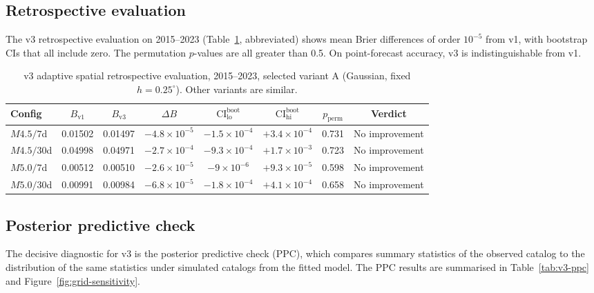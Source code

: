 \documentclass[10pt,a4paper,twocolumn]{article}
\begin{document}
\subsection{Retrospective evaluation}

The v3 retrospective evaluation on 2015--2023 (Table~\ref{tab:v3-results}, abbreviated) shows mean Brier differences of order $10^{-5}$ from v1, with bootstrap CIs that all include zero. The permutation $p$-values are all greater than 0.5. On point-forecast accuracy, v3 is indistinguishable from v1.

\begin{table}[t]
\centering
\caption{v3 adaptive spatial retrospective evaluation, 2015--2023, selected variant A (Gaussian, fixed $h=0.25^\circ$). Other variants are similar.}\label{tab:v3-results}
\small
\begin{tabular*}{\textwidth}{@{\extracolsep{\fill}}lccccccc}
\toprule
Config & $B_{\text{v1}}$ & $B_{\text{v3}}$ & $\Delta B$ & $\text{CI}^{\text{boot}}_{\text{lo}}$ & $\text{CI}^{\text{boot}}_{\text{hi}}$ & $p_{\text{perm}}$ & Verdict \\
\midrule
$M4.5/7$d  & 0.01502 & 0.01497 & $-4.8\times10^{-5}$ & $-1.5\times10^{-4}$ & $+3.4\times10^{-4}$ & 0.731 & No improvement \\
$M4.5/30$d & 0.04998 & 0.04971 & $-2.7\times10^{-4}$ & $-9.3\times10^{-4}$ & $+1.7\times10^{-3}$ & 0.723 & No improvement \\
$M5.0/7$d  & 0.00512 & 0.00510 & $-2.6\times10^{-5}$ & $-9\times10^{-6}$ & $+9.3\times10^{-5}$ & 0.598 & No improvement \\
$M5.0/30$d & 0.00991 & 0.00984 & $-6.8\times10^{-5}$ & $-1.8\times10^{-4}$ & $+4.1\times10^{-4}$ & 0.658 & No improvement \\
\bottomrule
\end{tabular*}
\end{table}

\subsection{Posterior predictive check}

The decisive diagnostic for v3 is the posterior predictive check (PPC), which compares summary statistics of the observed catalog to the distribution of the same statistics under simulated catalogs from the fitted model. The PPC results are summarised in Table~\ref{tab:v3-ppc} and Figure~\ref{fig:grid-sensitivity}.
\end{document}
